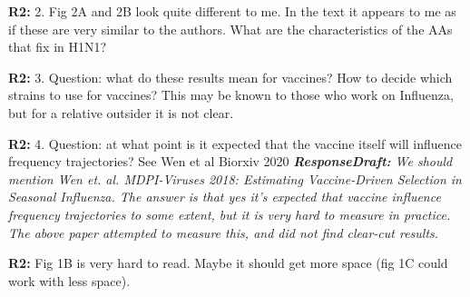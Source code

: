 \documentclass[aps,rmp,onecolumn]{revtex4-1}
\newcommand{\refb}[1]{\textbf{R2:} #1\vskip 5mm}
\newcommand{\responsedraft}[1]{{\it {\color{purple}\textbf{ResponseDraft:} #1}}}
\begin{document}
\refb{2. Fig 2A and 2B look quite different to me. In the text it appears to me as if these are very similar to the authors. What are the characteristics of the AAs that fix in H1N1? }

\refb{3. Question: what do these results mean for vaccines? How to decide which strains to use for vaccines? This may be known to those who work on Influenza, but for a relative outsider it is not clear. }

\refb{4. Question: at what point is it expected that the vaccine itself will influence frequency trajectories? See Wen et al Biorxiv 2020}
\responsedraft{We should mention Wen \emph{et. al.} MDPI-Viruses 2018: \emph{Estimating Vaccine-Driven Selection in Seasonal Influenza}. 
The answer is that yes it's expected that vaccine influence frequency trajectories to some extent, but it is very hard to measure in practice. 
The above paper attempted to measure this, and did not find clear-cut results.}

\refb{Fig 1B is very hard to read. Maybe it should get more space (fig 1C could work with less space).}
\end{document}
